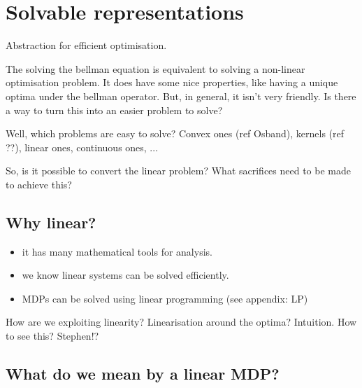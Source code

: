 \section{Solvable representations}

\begin{displayquote}
Abstraction for efficient optimisation.
\end{displayquote}

The solving the bellman equation is equivalent to solving a non-linear optimisation problem. It does have
some nice properties, like having a unique optima under the bellman
operator. But, in general, it isn't very friendly. Is there a way to
turn this into an easier problem to solve?


Well, which problems are easy to solve? Convex ones (ref Osband), kernels (ref ??), linear ones, continuous ones, ...

So, is it possible to convert the
 linear problem? What sacrifices need to be made to
achieve this?

\subsection{Why linear?}

\begin{itemize}
\tightlist
\item
  it has many mathematical tools for analysis.
\item
  we know linear systems can be solved efficiently.
\item
  MDPs can be solved using linear programming (see appendix: LP)
\end{itemize}

How are we exploiting linearity?
Linearisation around the optima? Intuition. How to see this? Stephen!?


\subsection{What do we mean by a linear MDP?}

